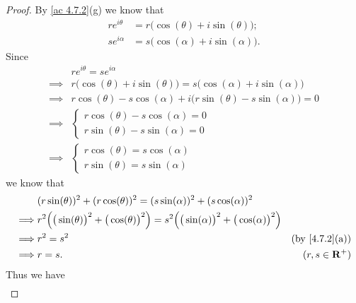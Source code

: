 \begin{proof}
  By \cref{ac 4.7.2}(g) we know that
  \begin{align*}
    r e^{i \theta} & = r \big(\cos(\theta) + i \sin(\theta)\big); \\
    s e^{i \alpha} & = s \big(\cos(\alpha) + i \sin(\alpha)\big).
  \end{align*}
  Since
  \begin{align*}
             & r e^{i \theta} = s e^{i \alpha}                                                       \\
    \implies & r \big(\cos(\theta) + i \sin(\theta)\big) = s \big(\cos(\alpha) + i \sin(\alpha)\big) \\
    \implies & r \cos(\theta) - s \cos(\alpha) + i \big(r \sin(\theta) - s \sin(\alpha)\big) = 0     \\
    \implies & \begin{cases}
                 r \cos(\theta) - s \cos(\alpha) = 0 \\
                 r \sin(\theta) - s \sin(\alpha) = 0
               \end{cases}                                                   \\
    \implies & \begin{cases}
                 r \cos(\theta) = s \cos(\alpha) \\
                 r \sin(\theta) = s \sin(\alpha)
               \end{cases}
  \end{align*}
  we know that
  \begin{align*}
             & (r \sin(\theta))^2 + (r \cos(\theta))^2 = (s \sin(\alpha))^2 + (s \cos(\alpha))^2                                                                                   \\
    \implies & r^2 \Big(\big(\sin(\theta)\big)^2 + \big(\cos(\theta)\big)^2\Big) = s^2 \Big(\big(\sin(\alpha)\big)^2 + \big(\cos(\alpha)\big)^2\Big)                               \\
    \implies & r^2 = s^2                                                                                                                             & \text{(by \cref{4.7.2}(a))} \\
    \implies & r = s.                                                                                                                                & (r, s \in \R^+)
  \end{align*}
  Thus we have
  \begin{align*}

\end{align*}
\end{proof}
